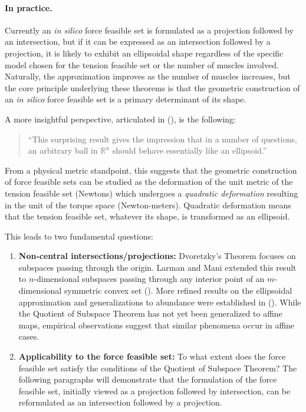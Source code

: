 \paragraph*{In practice.} Currently an \emph{in silico} force feasible set is formulated as a projection followed by an intersection, but if it can be expressed as an intersection followed by a projection, it is likely to exhibit an ellipsoidal shape regardless of the specific model chosen for the tension feasible set or the number of muscles involved. Naturally, the approximation improves as the number of muscles increases, but the core principle underlying these theorems is that the geometric construction of an \emph{in silico} force feasible set is a primary determinant of its shape.

A more insightful perspective, articulated in (\cite{pisierVolumeConvexBodies1989}), is the following:
\begin{quote}
    ``This surprising result gives the impression that in a number of questions, an arbitrary ball in $\mathbb{R}^n$ should behave essentially like an ellipsoid.''
\end{quote}

From a physical metric standpoint, this suggests that the geometric construction of force feasible sets can be studied as the deformation of the unit metric of the tension feasible set (Newtons) which undergoes a \emph{quadratic deformation} resulting in the unit of the torque space (Newton-meters). Quadratic deformation means that the tension feasible set, whatever its shape, is transformed as an ellipsoid.

This leads to two fundamental questions:
\begin{enumerate}
  \item {\textbf{Non-central intersections/projections:} Dvoretzky's Theorem focuses on subspaces passing through the origin. Larman and Mani extended this result to $n$-dimensional subspaces passing through any interior point of an $m$-dimensional symmetric convex set (\cite{larmanAlmostEllipsoidalSections1975a}). More refined results on the ellipsoidal approximation and generalizations to abundance were established in (\cite{gordonGaussianProcessesAlmost1988}). While the Quotient of Subspace Theorem has not yet been generalized to affine maps, empirical observations suggest that similar phenomena occur in affine cases.}
  \item {\textbf{Applicability to the force feasible set:} To what extent does the force feasible set satisfy the conditions of the Quotient of Subspace Theorem? The following paragraphs will demonstrate that the formulation of the force feasible set, initially viewed as a projection followed by intersection, can be reformulated as an intersection followed by a projection.}
\end{enumerate}

